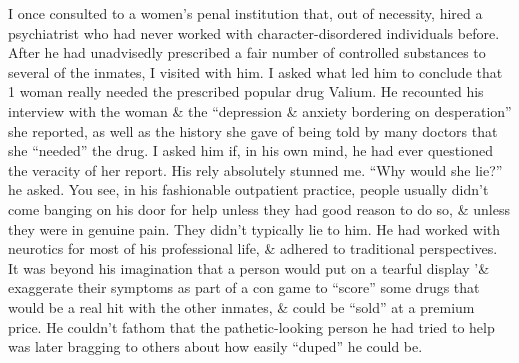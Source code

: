 \documentclass{article}
\numberwithin{equation}{section}
\begin{document}
\begin{itemize}
	I once consulted to a women's penal institution that, out of necessity, hired a psychiatrist who had never worked with character-disordered individuals before. After he had unadvisedly prescribed a fair number of controlled substances to several of the inmates, I visited with him. I asked what led him to conclude that 1 woman really needed the prescribed popular drug Valium. He recounted his interview with the woman \& the ``depression \& anxiety bordering on desperation'' she reported, as well as the history she gave of being told by many doctors that she ``needed'' the drug. I asked him if, in his own mind, he had ever questioned the veracity of her report. His rely absolutely stunned me. ``Why would she lie?'' he asked. You see, in his fashionable outpatient practice, people usually didn't come banging on his door for help unless they had good reason to do so, \& unless they were in genuine pain. They didn't typically lie to him. He had worked with neurotics for most of his professional life, \& adhered to traditional perspectives. It was beyond his imagination that a person would put on a tearful display '\& exaggerate their symptoms as part of a con game to ``score'' some drugs that would be a real hit with the other inmates, \& could be ``sold'' at a premium price. He couldn't fathom that the pathetic-looking person he had tried to help was later bragging to others about how easily ``duped'' he could be.
	

\end{itemize}
\end{document}
